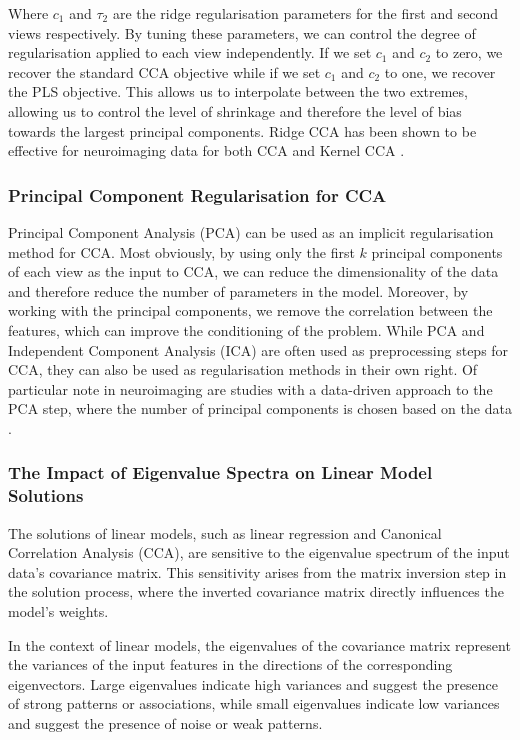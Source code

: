 Where $c_1$ and $\tau_2$ are the ridge regularisation parameters for the first and second views respectively.
By tuning these parameters, we can control the degree of regularisation applied to each view independently.
If we set $c_1$ and $c_2$ to zero, we recover the standard CCA objective while if we set $c_1$ and $c_2$ to one, we recover the PLS objective.
This allows us to interpolate between the two extremes, allowing us to control the level of shrinkage and therefore the level of bias towards the largest principal components. Ridge CCA has been shown to be effective for neuroimaging data for both CCA \citep{tenenhaus2011regularized, tuzhilina2023canonical, hardoon2004canonical} and Kernel CCA \citep{hardoon2007unsupervised}.

\subsubsection{Principal Component Regularisation for CCA} 
Principal Component Analysis (PCA) can be used as an implicit regularisation method for CCA. Most obviously, by using only the first \( k \) principal components of each view as the input to CCA, we can reduce the dimensionality of the data and therefore reduce the number of parameters in the model.
Moreover, by working with the principal components, we remove the correlation between the features, which can improve the conditioning of the problem.
While PCA and Independent Component Analysis (ICA) are often used as preprocessing steps for CCA, they can also be used as regularisation methods in their own right.
Of particular note in neuroimaging are studies with a data-driven approach to the PCA step, where the number of principal components is chosen based on the data \citep{liu2022improved, mihalik_canonical_2022}.

\subsubsection{The Impact of Eigenvalue Spectra on Linear Model Solutions}

The solutions of linear models, such as linear regression and Canonical Correlation Analysis (CCA), are sensitive to the eigenvalue spectrum of the input data's covariance matrix.
This sensitivity arises from the matrix inversion step in the solution process, where the inverted covariance matrix directly influences the model's weights.

In the context of linear models, the eigenvalues of the covariance matrix represent the variances of the input features in the directions of the corresponding eigenvectors.
Large eigenvalues indicate high variances and suggest the presence of strong patterns or associations, while small eigenvalues indicate low variances and suggest the presence of noise or weak patterns.

